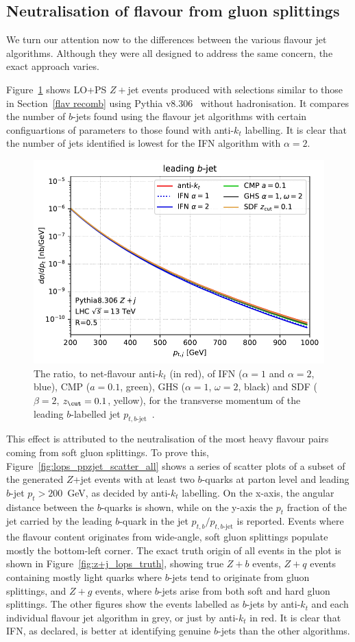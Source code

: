 \documentclass[10pt,a4paper]{book}
\begin{document}
\subsection{Neutralisation of flavour from gluon splittings}

We turn our attention now to the differences between the various flavour jet algorithms. Although they were all designed to address the same concern, the exact approach varies. 

Figure~\ref{fig:summary_ppzj_lops_bottom} shows LO+PS $Z+$jet events produced with selections similar to those in Section~\ref{flav recomb} using Pythia v8.306~\cite{Pythia:2022pfr} without hadronisation. It compares the number of $b$-jets found using the flavour jet algorithms with certain configuartions of parameters to those found with anti-$k_t$ labelling. It is clear that the number of jets identified is lowest for the IFN algorithm with $\alpha = 2$.

\begin{figure}
    \centering
    \includegraphics[width=0.49\linewidth,page=2]{ftag/lops_ppzjet/pythia-Zj-flav-algs.pdf}    \caption{The ratio, to net-flavour anti-$k_t$ (in red), of IFN ($\alpha=1$ and $\alpha=2$, blue), CMP ($a=0.1$, green), GHS ($\alpha=1$, $\omega=2$, black) and SDF ($\beta=2$, $z_{\cut}=0.1$, yellow), for the transverse momentum of the leading $b$-labelled jet $p_{t,b\text{-jet}}$~\cite{Behring:2025ilo}.}
    \label{fig:summary_ppzj_lops_bottom}
\end{figure}

This effect is attributed to the neutralisation of the most heavy flavour pairs coming from soft gluon splittings. To prove this, Figure~\ref{fig:lops_ppzjet_scatter_all}
 shows a series of scatter plots of a subset of the generated $Z$+jet events with at least two $b$-quarks at parton level and leading $b$-jet $p_t > 200$~GeV, as decided by anti-$k_t$ labelling. On the x-axis, the angular distance between the $b$-quarks is shown, while on the y-axis the $p_t$ fraction of the jet carried by the leading $b$-quark in the jet $p_{t,b}/p_{t, b\text{-jet}}$ is reported. Events where the flavour content originates from wide-angle, soft gluon splittings populate mostly the bottom-left corner. The exact truth origin of all events in the plot is shown in Figure~\ref{fig:z+j_lops_truth}, showing true $Z+b$ events, $Z+q$ events containing mostly light quarks where $b$-jets tend to originate from gluon splittings, and $Z+g$ events, where $b$-jets arise from both soft and hard gluon splittings. The other figures show the events labelled as $b$-jets by anti-$k_t$ and each individual flavour jet algorithm in grey, or just by anti-$k_t$ in red. It is clear that IFN, as declared, is better at identifying genuine $b$-jets than the other algorithms.
\end{document}
